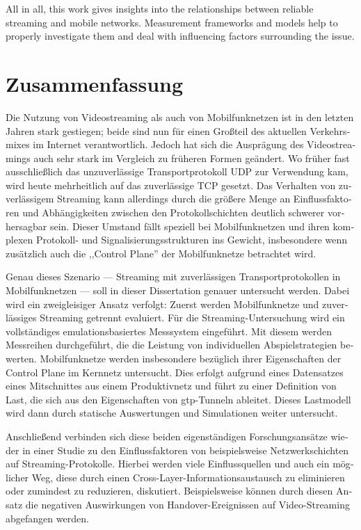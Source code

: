 All in all, this work gives insights into the relationships between reliable streaming and mobile networks. Measurement frameworks and models help to properly investigate them and deal with influencing factors surrounding the issue.


\chapter*{Zusammenfassung}
\begin{german}
Die Nutzung von Videostreaming als auch von Mobilfunknetzen ist in den letzten Jahren stark gestiegen; beide sind nun für einen Großteil des aktuellen Verkehrsmixes im Internet verantwortlich. Jedoch hat sich die Ausprägung des Videostreamings auch sehr stark im Vergleich zu früheren Formen geändert. Wo früher fast ausschließlich das unzuverlässige Transportprotokoll \acrshort{UDP} zur Verwendung kam, wird heute mehrheitlich auf das zuverlässige \acrshort{TCP} gesetzt. Das Verhalten von zuverlässigem Streaming kann allerdings durch die größere Menge an Einflussfaktoren und Abhängigkeiten zwischen den Protokollschichten deutlich schwerer vorhersagbar sein. Dieser Umstand fällt speziell bei Mobilfunknetzen und ihren komplexen Protokoll- und Signalisierungsstrukturen ins Gewicht, insbesondere wenn zusätzlich auch die ,,Control Plane'' der Mobilfunknetze betrachtet wird.

Genau dieses Szenario --- Streaming mit zuverlässigen Transportprotokollen in Mobilfunknetzen --- soll in dieser Dissertation genauer untersucht werden. Dabei wird ein zweigleisiger Ansatz verfolgt: Zuerst werden Mobilfunknetze und zuverlässiges Streaming getrennt evaluiert. Für die Streaming-Untersuchung wird ein vollständiges emulationsbasiertes Messsystem eingeführt. Mit diesem werden Messreihen durchgeführt, die die Leistung von individuellen Abspielstrategien bewerten. Mobilfunknetze werden insbesondere bezüglich ihrer Eigenschaften der Control Plane im Kernnetz untersucht. Dies erfolgt aufgrund eines Datensatzes eines Mitschnittes aus einem Produktivnetz und führt zu einer Definition von Last, die sich aus den Eigenschaften von \acrshort{gtp}-Tunneln ableitet. Dieses Lastmodell wird dann durch statische Auswertungen und Simulationen weiter untersucht.

Anschließend verbinden sich diese beiden eigenständigen Forschungsansätze wieder in einer Studie zu den Einflussfaktoren von beispielsweise 
Netzwerkschichten auf Streaming-Protokolle. Hierbei werden viele Einflussquellen und auch ein möglicher Weg, diese durch einen Cross-Layer-Informationsaustausch zu eliminieren oder zumindest zu reduzieren, diskutiert. Beispielsweise können durch diesen 
Ansatz die negativen Auswirkungen von Handover-Ereignissen auf Video-Streaming abgefangen werden.


\end{german}
